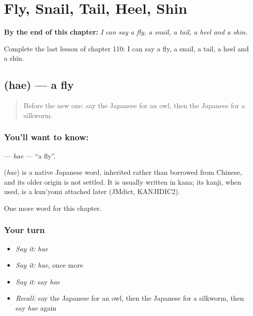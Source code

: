 
\chapter{Fly, Snail, Tail, Heel, Shin}
\label{ch:ja-fly-snail-tail-heel-shin}

\begin{chapteropening}
\textbf{By the end of this chapter:} \emph{I can say a fly, a snail, a tail, a heel and a shin.}

Complete the last lesson of chapter 110: I can say a fly, a snail, a tail, a heel and a shin.
\end{chapteropening}

\section[\texorpdfstring{\ja{はえ} (hae)}{はえ (hae)}]{ (hae) — a fly}

\label{lesson:JA-C110-hae}



\begin{quote}
Before the new one: say the Japanese for an owl, then the Japanese for a silkworm.
\end{quote}

\subsection*{You'll want to know: }
\textbf{} — \emph{hae} — \textquotedblleft{}a fly\textquotedblright{}.

\begin{cousinweb}
\textbf{} (\emph{hae}) is a native Japanese word, inherited rather than borrowed from Chinese, and its older origin is not settled. It is usually written in kana; its kanji, when used, is a kun'yomi attached later (JMdict, KANJIDIC2).
\end{cousinweb}

\begin{grammarlens}[title={What you've built}]
One more word for this chapter.
\end{grammarlens}

\subsection*{Your turn}
\begin{itemize}
\raggedright
  \item \emph{Say it:} \emph{hae}
  \item \emph{Say it:} \emph{hae}, once more
  \item \emph{Say it:} say \emph{hae}
  \item \emph{Recall:} say the Japanese for an owl, then the Japanese for a silkworm, then say \emph{hae} again
\end{itemize}

